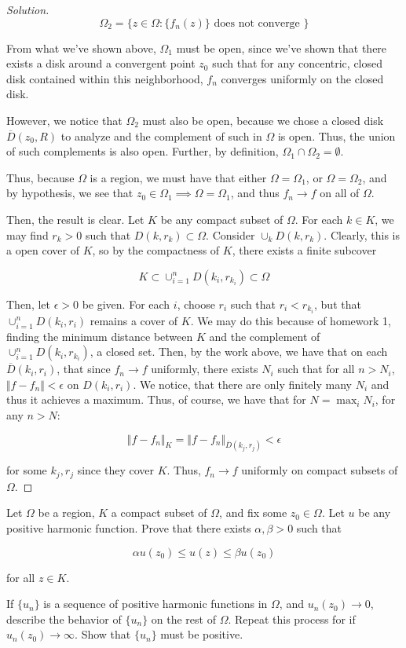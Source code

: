 \documentclass[10pt]{article}
\newenvironment{problem}[2][]{\begin{trivlist}
\item[\hskip \labelsep {\bfseries #1}\hskip \labelsep {\bfseries #2.}]}{\end{trivlist}}
\begin{document}
\begin{proof}[Solution]
$$\Omega_2 = \{ z \in \Omega : \{ f_n(z) \} \text{ does not converge } \} $$

From what we've shown above, $\Omega_1$ must be open, since we've shown that there exists a disk around a convergent point $z_0$ such that for any concentric, closed disk contained within this neighborhood, $f_n$ converges uniformly on the closed disk.

However, we notice that $\Omega_2$ must also be open, because we chose a closed disk $\overline{D}(z_0,R)$ to analyze and the complement of such in $\Omega$ is open. Thus, the union of such complements is also open. Further, by definition, $\Omega_1 \cap \Omega_2 = \emptyset$. 

Thus, because $\Omega$ is a region, we must have that either $\Omega = \Omega_1$, or $\Omega = \Omega_2$, and by hypothesis, we see that $z_0 \in \Omega_1 \implies \Omega = \Omega_1$, and thus $f_n \to f$ on all of $\Omega$.

Then, the result is clear. Let $K$ be any compact subset of $\Omega$. For each $k \in K$, we may find $r_k > 0$ such that $D(k,r_k) \subset \Omega$. Consider $\cup_k D(k,r_k)$. Clearly, this is a open cover of $K$, so by the compactness of $K$, there exists a finite subcover

$$ K \subset  \cup_{i =1}^n D(k_i, r_{k_i}) \subset \Omega $$

Then, let $\epsilon > 0$ be given. For each $i$, choose $r_i$ such that $r_i < r_{k_i}$, but that $\cup_{i=1}^n D(k_i, r_i)$ remains a cover of $K$. We may do this because of homework 1, finding the minimum distance between $K$ and the complement of $ \cup_{i =1}^n D(k_i, r_{k_i}) $, a closed set. Then, by the work above, we have that on each $\overline{D}(k_i, r_i)$, that since $f_n \to f$ uniformly, there exists $N_i$ such that for all $n > N_i$, $\Vert f - f_n \Vert < \epsilon$ on $D(k_i, r_i)$. We notice, that there are only finitely many $N_i$ and thus it achieves a maximum. Thus, of course, we have that for $N = \max_i N_i$, for any $n > N$:

$$ \Vert f - f_n \Vert_K  = \Vert f - f_n \Vert_{\overline{D}(k_j, r_j)} < \epsilon $$

for some $k_j, r_j$ since they cover $K$. Thus, $f_n \to f$ uniformly on compact subsets of $\Omega$. 

\end{proof}
  

\begin{problem}{Question 5}
Let $\Omega$ be a region, $K$ a compact subset of $\Omega$, and fix some $z_0 \in \Omega$. Let $u$ be any positive harmonic function. Prove that there exists $\alpha, \beta > 0$ such that

$$ \alpha u(z_0) \leq u(z) \leq \beta u(z_0) $$

for all $z \in K$.

If $\{ u_n \}$ is a sequence of positive harmonic functions in $\Omega$, and $u_n(z_0) \to 0$, describe the behavior of $\{ u_n \}$ on the rest of $\Omega$. Repeat this process for if $u_n(z_0) \to \infty$. Show that $\{ u_n \}$ must be positive.

\end{problem}
\end{document}
